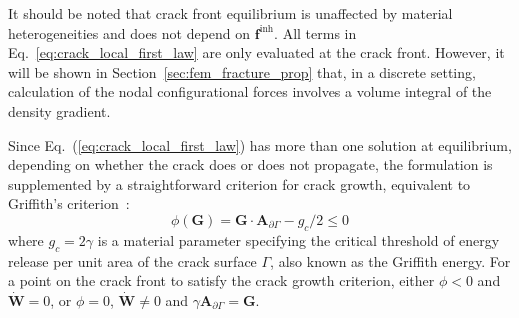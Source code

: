 \documentclass[review]{elsarticle}
\numberwithin{equation}{section}
\begin{document}
It should be noted that crack front equilibrium is unaffected by material heterogeneities and does not depend on $\mathbf f^{\mathrm {inh}}$. All terms in Eq.~\ref{eq:crack_local_first_law} are only evaluated at the crack front. However, it will be shown in Section~\ref{sec:fem_fracture_prop} that, in a discrete setting, calculation of the nodal configurational forces involves a volume integral of the density gradient.


%
%

Since Eq.~(\ref{eq:crack_local_first_law}) has more than one solution at equilibrium, depending on whether the crack 
does or does not propagate, the formulation is supplemented by a straightforward criterion for crack growth, equivalent to Griffith's  criterion~\citep{kaczmarczyk2017energy}:
\begin{equation} \label{eq:grif1}
\phi(\mathbf{G}) = 
\mathbf{G} \cdot \mathbf{A}_{\partial\Gamma} - g_c/2 \leq 0
\end{equation} 
where $g_c=2\gamma$ is a material parameter specifying the critical threshold of energy release
per unit area of the crack surface $\Gamma$, also known as the Griffith energy. For a point on the crack front to satisfy the crack growth criterion, 
either $\phi<0$ and $\dot{\mathbf{W}}=0$, or $\phi=0$, $\dot{\mathbf{W}}\ne 0$ and $\gamma\mathbf{A}_{\partial\Gamma}=\mathbf{G}$. 


\end{document}
